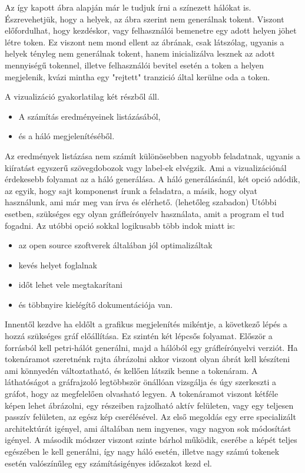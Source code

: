 Az így kapott ábra alapján már le tudjuk írni a színezett hálókat is. Észrevehetjük, hogy a helyek, az ábra szerint nem generálnak tokent. Viszont előfordulhat, hogy kezdéskor, vagy felhasználói bemenetre egy adott helyen jöhet létre token. Ez viszont nem mond ellent az ábrának, csak látszólag, ugyanis a helyek tényleg nem generálnak tokent, hanem inicializálva lesznek az adott mennyiségű tokennel, illetve felhasználói bevitel esetén a token a helyen megjelenik, kvázi mintha egy "rejtett" tranzició által kerülne oda a token. 

A vizualizáció gyakorlatilag két részből áll.
\begin{itemize}
\item A számítás eredményeinek listázásából,
\item és a háló megjelenítéséből. 
\end{itemize}

Az eredmények listázása nem számít különösebben nagyobb feladatnak, ugyanis a kiíratást egyszerű szövegdobozok vagy label-ek elvégzik. Ami a vizualizációnál érdekesebb folyamat az a háló generálása. 
A háló generálásánál, két opció adódik, az egyik, hogy sajt komponenst írunk a feladatra, a másik, hogy olyat használunk, ami már meg van írva és elérhető. (lehetőleg szabadon) Utóbbi esetben, szükséges egy olyan gráfleírónyelv használata, amit a program el tud fogadni. Az utóbbi opció sokkal logikusabb több indok miatt is:
\begin{itemize}
\item az open source szoftverek általában jól optimalizáltak
\item kevés helyet foglalnak
\item időt lehet vele megtakarítani
\item és többnyire kielégítő dokumentációja van.
\end{itemize}

Innentől kezdve ha eldőlt a grafikus megjelenítés mikéntje, a következő lépés a hozzá szükséges gráf előállítása. Ez szintén két lépcsős folyamat. Először a forrásból kell petri-hálót generálni, majd a hálóból egy gráfleírónyelvi verziót. Ha tokenáramot szeretnénk rajta ábrázolni akkor viszont olyan ábrát kell készíteni ami könnyedén változtatható, és kellően látszik benne a tokenáram. A láthatóságot a gráfrajzoló legtöbbször önállóan vizsgálja és úgy szerkeszti a gráfot, hogy az megfelelően olvasható legyen. A tokenáramot viszont kétféle képen lehet ábrázolni, egy részeiben rajzolható aktív felületen, vagy egy teljesen passzív felületen, az egész kép cserélésével. Az első megoldás egy erre specializált architektúrát igényel, ami általában nem ingyenes, vagy nagyon sok módosítást igényel. A második módszer viszont szinte bárhol működik, cserébe a képét teljes egészében le kell generálni, így nagy háló esetén, illetve nagy számú tokenek esetén valószínűleg egy számításigényes időszakot kezd el. 

